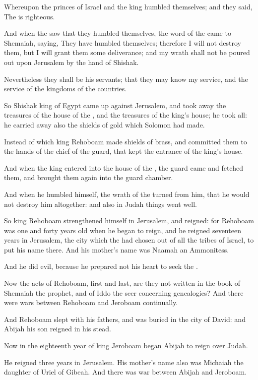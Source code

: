 \Verse Whereupon the princes of Israel and the king humbled themselves; and they said, The \LORD is righteous.

\Verse And when the \LORD saw that they humbled themselves, the word of the \LORD came to Shemaiah, saying, They have humbled themselves; therefore I will not destroy them, but I will grant them some deliverance; and my wrath shall not be poured out upon Jerusalem by the hand of Shishak.

\Verse Nevertheless they shall be his servants; that they may know my service, and the service of the kingdoms of the countries.

\Verse So Shishak king of Egypt came up against Jerusalem, and took away the treasures of the house of the \LORD, and the treasures of the king's house; he took all: he carried away also the shields of gold which Solomon had made.

\Verse Instead of which king Rehoboam made shields of brass, and committed them to the hands of the chief of the guard, that kept the entrance of the king's house.

\Verse And when the king entered into the house of the \LORD, the guard came and fetched them, and brought them again into the guard chamber.

\Verse And when he humbled himself, the wrath of the \LORD turned from him, that he would not destroy him altogether: and also in Judah things went well.

\Verse So king Rehoboam strengthened himself in Jerusalem, and reigned: for Rehoboam was one and forty years old when he began to reign, and he reigned seventeen years in Jerusalem, the city which the \LORD had chosen out of all the tribes of Israel, to put his name there. And his mother's name was Naamah an Ammonitess.

\Verse And he did evil, because he prepared not his heart to seek the \LORD.

\Verse Now the acts of Rehoboam, first and last, are they not written in the book of Shemaiah the prophet, and of Iddo the seer concerning genealogies? And there were wars between Rehoboam and Jeroboam continually.

\Verse And Rehoboam slept with his fathers, and was buried in the city of David: and Abijah his son reigned in his stead.


\Chapter
\Verse Now in the eighteenth year of king Jeroboam began Abijah to reign over Judah.

\Verse He reigned three years in Jerusalem. His mother's name also was Michaiah the daughter of Uriel of Gibeah. And there was war between Abijah and Jeroboam.

